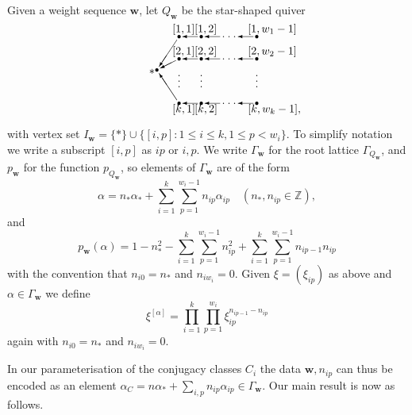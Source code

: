 \documentclass[12pt,a4paper]{amsart}
\theoremstyle{plain}
\newcommand{\Z}{\mathbb Z}
\newcommand{\bw}{\mathbf w}
\begin{document}
Given a weight sequence $\bw$, let $Q_\bw$ be the star-shaped quiver
\setlength{\unitlength}{1.5pt}
\[
\begin{picture}(110,80)
\put(10,40){\circle*{2.5}} \put(30,10){\circle*{2.5}}
\put(30,50){\circle*{2.5}} \put(30,70){\circle*{2.5}}
\put(50,10){\circle*{2.5}} \put(50,50){\circle*{2.5}}
\put(50,70){\circle*{2.5}} \put(100,10){\circle*{2.5}}
\put(100,50){\circle*{2.5}} \put(100,70){\circle*{2.5}}
\put(28,67){\vector(-2,-3){16}}
\put(27,48.5){\vector(-2,-1){14}}
\put(28,13){\vector(-2,3){16}}
\put(47,10){\vector(-1,0){14}}
\put(47,50){\vector(-1,0){14}}
\put(47,70){\vector(-1,0){14}}
\put(67,10){\vector(-1,0){14}}
\put(67,50){\vector(-1,0){14}}
\put(67,70){\vector(-1,0){14}}
\put(97,10){\vector(-1,0){14}}
\put(97,50){\vector(-1,0){14}}
\put(97,70){\vector(-1,0){14}}
\put(70,10){\circle*{1}}
\put(75,10){\circle*{1}} \put(80,10){\circle*{1}}
\put(70,50){\circle*{1}} \put(75,50){\circle*{1}}
\put(80,50){\circle*{1}} \put(70,70){\circle*{1}}
\put(75,70){\circle*{1}} \put(80,70){\circle*{1}}
\put(30,25){\circle*{1}} \put(30,30){\circle*{1}}
\put(30,35){\circle*{1}} \put(50,25){\circle*{1}}
\put(50,30){\circle*{1}} \put(50,35){\circle*{1}}
\put(100,25){\circle*{1}} \put(100,30){\circle*{1}}
\put(100,35){\circle*{1}} \put(3,36.3){$*$} \put(24,2){$[k,1]$}
\put(24,54){$[2,1]$} \put(24,74){$[1,1]$} \put(44,2){$[k,2]$}
\put(44,54){$[2,2]$} \put(44,74){$[1,2]$} \put(92,2){$[k,w_k-1],$}
\put(92,54){$[2,w_2-1]$} \put(92,74){$[1,w_1-1]$}
\end{picture}
\]
with vertex set $I_\bw=\{ * \} \cup \{ [i,p] : 1\le i\le k, 1\le p < w_i \}$.
To simplify notation we write a subscript $[i,p]$ as $ip$ or $i,p$. We write $\Gamma_\bw$ for the root lattice $\Gamma_{Q_\bw}$, and $p_\bw$ for the function $p_{Q_\bw}$, so elements of $\Gamma_\bw$ are of the form
\[
\alpha = n_* \alpha_* + \sum_{i=1}^k \sum_{p=1}^{w_i-1} n_{ip} \alpha_{ip} \quad (n_*, n_{ip}\in\Z),
\]
and
\[
p_\bw(\alpha) = 1 - n_*^2 - \sum_{i=1}^k\sum_{p=1}^{w_i-1} n_{ip}^2
+ \sum_{i=1}^k\sum_{p=1}^{w_i-1} n_{ip-1} n_{ip}
\]
with the convention that $n_{i0}=n_\ast$ and $n_{iw_i}=0$. Given $\xi = (\xi_{ip})$ as above and $\alpha\in\Gamma_\bw$ we define
\[ \xi^{[\alpha]} = \prod_{i=1}^k \prod_{p=1}^{w_i} \xi_{ip}^{n_{ip-1} - n_{ip}} \]
again with $n_{i0} = n_*$ and $n_{iw_i}=0$.


In our parameterisation of the conjugacy classes $C_i$ the data $\bw,n_{ip}$ can thus be encoded as an element $\alpha_C=n\alpha_\ast+\sum_{i,p}n_{ip}\alpha_{ip}\in \Gamma_\bw$. Our main result is now as follows.
\end{document}
